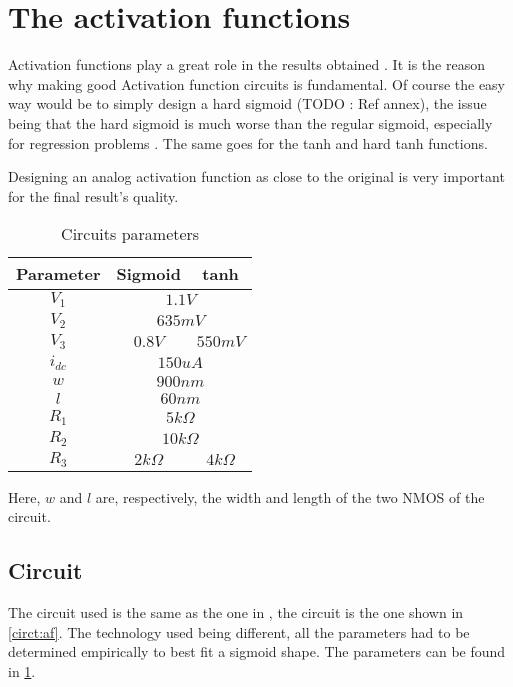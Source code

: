 \section{The activation functions}
\label{sec:af}

Activation functions play a great role in the results obtained \cite{af}. It is the reason why making good Activation function circuits is fundamental. Of course the easy way would be to simply design a hard sigmoid (TODO : Ref annex), the issue being that the hard sigmoid is much worse than the regular sigmoid, especially for regression problems \cite{hardSigm}. The same goes for the \ac{tanh} and hard \ac{tanh} functions.

Designing an analog activation function as close to the original is very important for the final result's quality.

\begin{table}[H]
  \centering
  \begin{tabular}{|c|c|c|}
    \hline
    \rowcolor{gray}
    Parameter & Sigmoid & \ac{tanh} \\
    \hline
    $V_1$ & \multicolumn{2}{c|}{$1.1V$}\\
    \hline
    $V_2$ & \multicolumn{2}{c|}{$635mV$}\\
    \hline
    $V_3$ & $0.8V$ & $550mV$\\
    \hline
    $i_{dc}$ & \multicolumn{2}{c|}{$150uA$}\\
    \hline
    $w$ & \multicolumn{2}{c|}{$900nm$}\\
    \hline
    $l$ & \multicolumn{2}{c|}{$60nm$}\\
    \hline
    $R_1$ & \multicolumn{2}{c|}{$5k\Omega$}\\
    \hline
    $R_2$ & \multicolumn{2}{c|}{$10k\Omega$}\\
    \hline
    $R_3$ & $2k\Omega$ & $4k\Omega$\\
    \hline
  \end{tabular}
  \caption{Circuits parameters}
  \label{tab:afPar}
\end{table}

Here, $w$ and $l$ are, respectively, the width and length of the two NMOS of the circuit.

\subsection{Circuit}

The circuit used is the same as the one in \cite{thesisRef}, the circuit is the one shown in \cref{circt:af}. The technology used being different, all the parameters had to be determined empirically to best fit a sigmoid shape. The parameters can be found in \cref{tab:afPar}.

